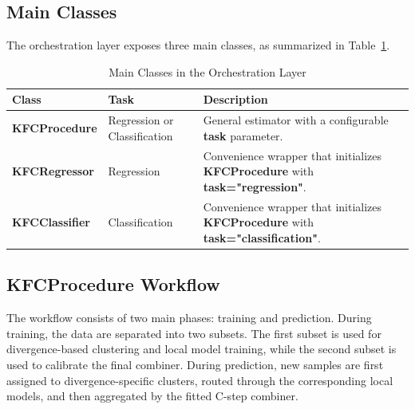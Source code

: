 \subsection{Main Classes}

\hs The orchestration layer exposes three main classes, as summarized in Table~\ref{tab:orchestration_main_classes}.

\begin{table}[H]
      \centering
      \caption{Main Classes in the Orchestration Layer}
      \label{tab:orchestration_main_classes}
      \renewcommand{\arraystretch}{1.2}
      \begin{tabularx}{\textwidth}{
                  >{\raggedright\arraybackslash}p{3.2cm}
                  >{\raggedright\arraybackslash}p{3.0cm}
                  >{\raggedright\arraybackslash}X
            }
            \toprule
            \textbf{Class}               & \textbf{Task} & \textbf{Description}                             \\
            \midrule
            \textbf{KFCProcedure}        &
            Regression or Classification &
            General estimator with a configurable \textbf{task} parameter.                                  \\

            \textbf{KFCRegressor}        &
            Regression                   &
            Convenience wrapper that initializes \textbf{KFCProcedure} with \textbf{task="regression"}.     \\

            \textbf{KFCClassifier}       &
            Classification               &
            Convenience wrapper that initializes \textbf{KFCProcedure} with \textbf{task="classification"}. \\
            \bottomrule
      \end{tabularx}
\end{table}

\subsection{KFCProcedure Workflow}

\hs The \KFCProcedure{} workflow consists of two main phases: training and prediction. During training, the data are separated into two subsets. The first subset is used for divergence-based clustering and local model training, while the second subset is used to calibrate the final combiner. During prediction, new samples are first assigned to divergence-specific clusters, routed through the corresponding local models, and then aggregated by the fitted C-step combiner.

